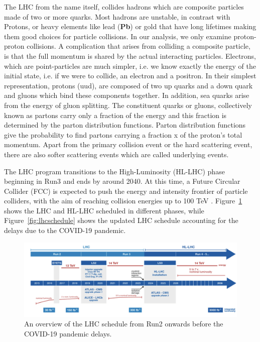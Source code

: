 The LHC from the name itself, collides hadrons which are composite particles made of two or more quarks. Most hadrons are unstable, in contrast with Protons, or heavy elements like lead (\textbf{Pb}) or gold that have long lifetimes making them good choices for particle collisions. In our analysis, we only examine proton-proton collisions. A complication that arises from colliding a composite particle, is that the full momentum is shared by the actual interacting particles. Electrons, which are point-particles are much simpler, i.e. we know exactly the energy of the initial state, i.e. if we were to collide, an electron and a positron. In their simplest representation, protons (uud), are composed of two up quarks and a down quark and gluons which bind these components together. In addition, sea quarks arise from the energy of gluon splitting. The constituent quarks or gluons, collectively known as partons carry only a fraction of the energy and this fraction is determined by the parton distribution functions. Parton distribution functions give the probability to find partons carrying a fraction x of the proton's total momentum. Apart from the primary collision event or the hard scattering event, there are also softer scattering events which are called underlying events. 

The LHC program transitions to the High-Luminosity (HL-LHC) phase beginning in Run3 and ends by around 2040. At this time, a Future Circular Collider (FCC) is expected to push the energy and intensity frontier of particle colliders, with the aim of reaching collision energies up to 100 TeV \cite{Blondel:2021ema}. Figure~\ref{fig:hl-lhc} shows the LHC and HL-LHC scheduled in different phases, while Figure~\ref{fig:lhcschedule} shows the updated LHC schedule accounting for the delays due to the COVID-19 pandemic.

\begin{figure}[!htbp]
	\centering
 	\includegraphics[scale=0.6]{fig/LHC-schedule.png}
    \caption{An overview of the LHC schedule from Run2 onwards before the COVID-19 pandemic delays.}
	\label{fig:hl-lhc}
\end{figure}



